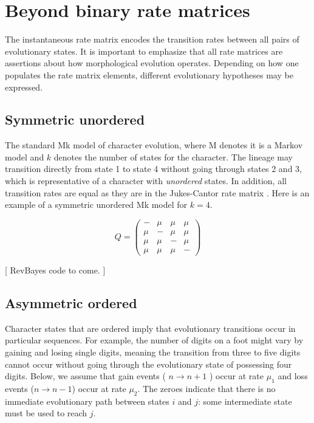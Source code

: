 \section{Beyond binary rate matrices} \label{sec:dm_matrix}

The instantaneous rate matrix encodes the transition rates between all pairs of evolutionary states.
It is important to emphasize that all rate matrices are assertions about how morphological evolution operates.
Depending on how one populates the rate matrix elements, different evolutionary hypotheses may be expressed.


\subsection{Symmetric unordered}

The standard Mk model of character evolution, where M denotes it is a Markov model and $k$ denotes the number of states for the character.
The lineage may transition directly from state 1 to state 4 without going through states 2 and 3, which is representative of a character with {\it unordered} states.
In addition, all transition rates are equal as they are in the Jukes-Cantor rate matrix \citep{jukes69}.
Here is an example of a symmetric unordered Mk model for $k=4$.

\begin{equation*}
Q = \begin{pmatrix}
- & \mu & \mu & \mu \\
\mu & -   & \mu & \mu \\
\mu & \mu & -   & \mu \\
\mu & \mu & \mu & - 
\end{pmatrix}
\end{equation*}

[ RevBayes code to come. ]


\subsection{Asymmetric ordered}

Character states that are ordered imply that evolutionary transitions occur in particular sequences.
For example, the number of digits on a foot might vary by gaining and losing single digits, meaning the transition from three to five digits cannot occur without going through the evolutionary state of possessing four digits.
Below, we assume that gain events ( $n \rightarrow n+1$ ) occur at rate $\mu_1$ and loss events ($n \rightarrow n-1$) occur at rate $\mu_2$.
The zeroes indicate that there is no immediate evolutionary path between states $i$ and $j$: some intermediate state must be used to reach $j$.

